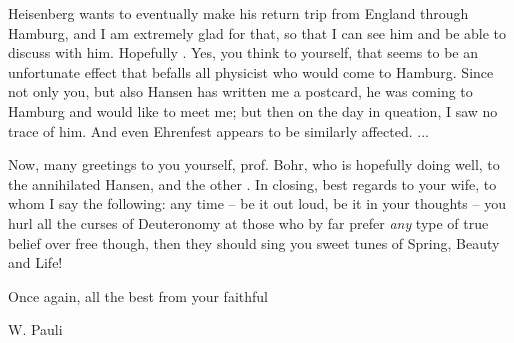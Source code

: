 Heisenberg wants to eventually make his return trip from England through Hamburg, and I am extremely glad for that, so that I can see him and be able to discuss with him. Hopefully . Yes, you think to yourself, that seems to be an unfortunate effect that befalls all physicist who would come to Hamburg. Since not only you, but also Hansen has written me a postcard, he was coming to Hamburg and would like to meet me; but then on the day in queation, I saw no trace of him. And even Ehrenfest appears to be similarly affected. ...

Now, many greetings to you yourself, prof. Bohr, who is hopefully doing well, to the annihilated Hansen, and the other . In closing, best regards to your wife, to whom I say the following: any time -- be it out loud, be it in your thoughts -- you hurl all the curses of Deuteronomy at those who by far prefer \textit{any} type of true belief over free though, then they should sing you sweet tunes of Spring, Beauty and Life!

Once again, all the best from your faithful

W. Pauli


